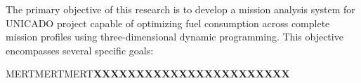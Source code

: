 The primary objective of this research is to develop a mission analysis system for UNICADO project capable of optimizing fuel consumption across complete mission profiles using three-dimensional dynamic programming. This objective encompasses several specific goals:

MERTMERTMERT\textbf{XXXXXXXXXXXXXXXXXXXXXXX}